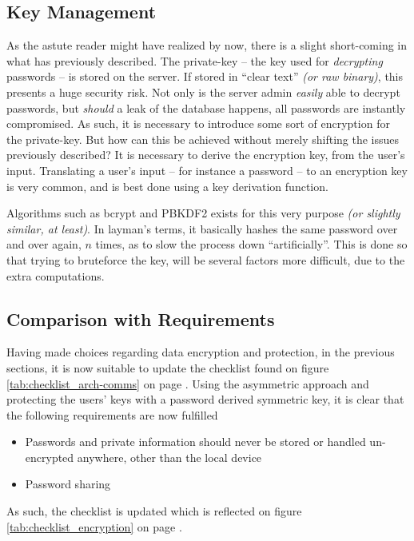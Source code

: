 		\subsection{Key Management}
			\label{sec:keys}
			As the astute reader might have realized by now, there is a slight short-coming in what has previously described. The private-key -- the key used for \emph{decrypting} passwords -- is stored on the server. If stored in ``clear text'' \emph{(or raw binary)}, this presents a huge security risk. Not only is the server admin \emph{easily} able to decrypt passwords, but \emph{should} a leak of the database happens, all passwords are instantly compromised.
			As such, it is necessary to introduce some sort of encryption for the private-key. But how can this be achieved without merely shifting the issues previously described? It is necessary to derive the encryption key, from the user's input. Translating a user's input -- for instance a password -- to an encryption key is very common, and is best done using a key derivation function. 

			Algorithms such as bcrypt and PBKDF2 exists for this very purpose \emph{(or slightly similar, at least)}. In layman's terms, it basically hashes the same password over and over again, $n$ times, as to slow the process down ``artificially''. This is done so that trying to bruteforce the key, will be several factors more difficult, due to the extra computations.

		\subsection{Comparison with Requirements}
			Having made choices regarding data encryption and protection, in the previous sections, it is now suitable to update the checklist found on figure \ref{tab:checklist_arch-comms} on page \pageref{tab:checklist_arch-comms}. Using the asymmetric approach and protecting the users' keys with a password derived symmetric key, it is clear that the following requirements are now fulfilled
			\begin{itemize}
				\item Passwords and private information should never be stored or handled un-encrypted anywhere, other than the local device
				\item Password sharing
			\end{itemize}
			As such, the checklist is updated which is reflected on figure \ref{tab:checklist_encryption} on page \pageref{tab:checklist_encryption}.

